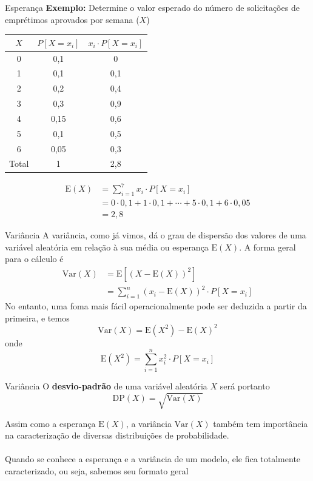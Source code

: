 \documentclass[10pt]{beamer}\usepackage[]{graphicx}\usepackage[]{color}
\providecommand{\E}{\text{E}}
\providecommand{\Var}{\text{Var}}
\providecommand{\DP}{\text{DP}}
\theoremstyle{definition}
\begin{document}
\begin{frame}[fragile]{Esperança}
  \textbf{Exemplo:} Determine o valor esperado do número de solicitações
  de emprétimos aprovados por semana ($X$)
  \begin{table}[h]
    \centering
    \begin{tabular}{ccc}
      \hline
      $X$ & $P[X = x_i]$ & $x_i \cdot P[X=x_i]$ \\
      \hline
      0 & 0,1 & 0 \\
      1 & 0,1 & 0,1 \\
      2 & 0,2 & 0,4 \\
      3 & 0,3 & 0,9 \\
      4 & 0,15 & 0,6  \\
      5 & 0,1 & 0,5\\
      6 & 0,05 & 0,3\\
      \hline
      Total & 1 & 2,8 \\
      \hline
    \end{tabular}
  \end{table}
  \begin{align*}
    \E(X) &= \sum_{i=1}^{7} x_i \cdot P[X = x_i] \\
          &= 0 \cdot 0,1 + 1 \cdot 0,1 + \cdots + 5 \cdot 0,1 + 6 \cdot
          0,05 \\
          &= 2,8
  \end{align*}
\end{frame}

\begin{frame}[fragile]{Variância}
  A variância, como já vimos, dá o grau de dispersão
  dos valores de uma variável aleatória em relação à sua média ou
  esperança $\E(X)$.  A forma geral para o cálculo é
  \begin{align*}
    \Var(X) &= \E[(X - \E(X))^2] \\
            &= \sum_{i=1}^{n} (x_i - \E(X))^2 \cdot P[X=x_i]
  \end{align*}
  No entanto, uma foma mais fácil operacionalmente pode ser deduzida a
  partir da primeira, e temos
  \begin{equation*}
    \Var(X) = \E(X^2) - \E(X)^2
  \end{equation*}
  onde
  \begin{equation*}
    \E(X^2) = \sum_{i = 1}^{n} x_{i}^{2} \cdot P[X = x_i]
  \end{equation*}
\end{frame}

\begin{frame}[fragile]{Variância}
  O \textbf{desvio-padrão} de uma variável aleatória $X$ será portanto
  \begin{equation*}
    \DP(X) = \sqrt{\Var(X)}
  \end{equation*}

  \vspace{1em}
  Assim como a esperança $\E(X)$, a variância $\Var(X)$ também tem
  importância na caracterização de diversas distribuições de
  probabilidade. \\~\\
  Quando se conhece a esperança e a variância de um modelo, ele fica
  totalmente caracterizado, ou seja, sabemos seu formato geral
\end{frame}
\end{document}
